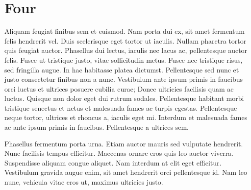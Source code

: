 \section{Four}
Aliquam feugiat finibus sem et euismod. Nam porta dui ex, sit amet fermentum felis hendrerit vel. Duis scelerisque eget tortor ut iaculis. Nullam pharetra tortor quis feugiat auctor. Phasellus dui lectus, iaculis nec lacus ac, pellentesque auctor felis. Fusce ut tristique justo, vitae sollicitudin metus. Fusce nec tristique risus, sed fringilla augue. In hac habitasse platea dictumst. Pellentesque sed nunc et justo consectetur finibus non a nunc. Vestibulum ante ipsum primis in faucibus orci luctus et ultrices posuere cubilia curae; Donec ultricies facilisis quam ac luctus. Quisque non dolor eget dui rutrum sodales. Pellentesque habitant morbi tristique senectus et netus et malesuada fames ac turpis egestas. Pellentesque neque tortor, ultrices et rhoncus a, iaculis eget mi. Interdum et malesuada fames ac ante ipsum primis in faucibus. Pellentesque a ultrices sem.

Phasellus fermentum porta urna. Etiam auctor mauris sed vulputate hendrerit. Nunc facilisis tempus efficitur. Maecenas ornare eros quis leo auctor viverra. Suspendisse aliquam congue aliquet. Nam interdum at elit eget efficitur. Vestibulum gravida augue enim, sit amet hendrerit orci pellentesque id. Nam leo nunc, vehicula vitae eros ut, maximus ultricies justo.


